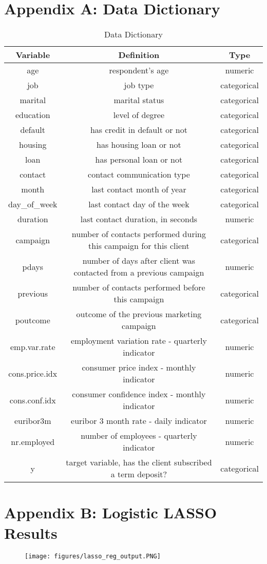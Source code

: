 \documentclass[12pt]{article}
\begin{document}
\section*{Appendix A: Data Dictionary}
\begin{table}[h]
\caption{Data Dictionary \label{table:data_dict}}
\centering
   \begin{tabular}{|c|c|c|}
    \hline
    Variable & Definition & Type\\
    \hline
    age & respondent's age & numeric \\
    \hline
    job & job type & categorical\\
    \hline
    marital & marital status & categorical\\
    \hline
    education & level of degree & categorical\\
    \hline
    default & has credit in default or not & categorical\\
    \hline
    housing & has housing loan or not & categorical\\
    \hline
    loan & has personal loan or not & categorical\\
    \hline
    contact & contact communication type & categorical\\
    \hline
    month & last contact month of year & categorical\\
    \hline
    day\_of\_week & last contact day of the week & categorical\\
    \hline
    duration & last contact duration, in seconds &numeric\\
    \hline
    campaign & number of contacts performed during this campaign for this client&categorical\\
    \hline
    pdays & number of days after client was contacted from a previous campaign&numeric\\
    \hline
    previous&number of contacts performed before this campaign&categorical\\
    \hline
    poutcome&outcome of the previous marketing campaign&categorical\\
    \hline
    emp.var.rate&employment variation rate - quarterly indicator&numeric\\
    \hline
    cons.price.idx & consumer price index - monthly indicator & numeric\\
    \hline
    cons.conf.idx & consumer confidence index - monthly indicator & numeric\\
    \hline
    euribor3m & euribor 3 month rate - daily indicator & numeric\\
    \hline
    nr.employed & number of employees - quarterly indicator & numeric\\
    \hline
    y & target variable, has the client subscribed a term deposit? & categorical\\
    \hline
\end{tabular}
\end{table}

\clearpage \newpage
\section*{Appendix B: Logistic LASSO Results}

\begin{figure}[ht!]
    \centering
    \texttt{[image: figures/lasso\_reg\_output.PNG]}
    \label{lasso_reg}
\end{figure}
\end{document}
